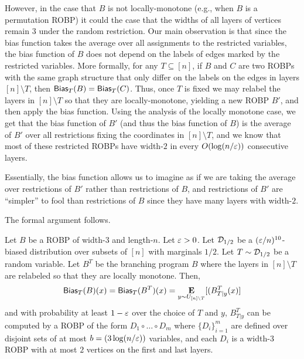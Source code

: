 However, in the case that $B$ is not locally-monotone (e.g.,  when $B$ is a permutation ROBP) it could the case that the widths of all layers of vertices remain $3$ under the random restriction.
Our main observation is that since the bias function takes the average over all assignments to the restricted variables, the bias function of $B$ does not depend on the labels of edges marked by the restricted variables. 
More formally, for any $T \subseteq [n]$, if $B$ and $C$ are two ROBPs with the same graph structure that only differ on the labels on the edges in layers $[n]\setminus T$, then $\mathsf{Bias}_T(B) = \mathsf{Bias}_T(C)$.
Thus, once $T$ is fixed we may relabel the layers in $[n]\setminus T$ so that they are locally-monotone, yielding a new ROBP $B'$, and then apply the bias function.
Using the analysis of the locally monotone case, we get that the bias function of $B'$ (and thus the bias function of $B$) is the average of $B'$ over all restrictions fixing the coordinates in $[n]\setminus T$, and we know that most of these restricted ROBPs have width-$2$ in every $O(\log (n/\varepsilon))$ consecutive layers.

Essentially, the bias function allows us to imagine as if we are taking the average over restrictions of $B'$ rather than restrictions of $B$, and restrictions of $B'$ are ``simpler'' to fool than restrictions of $B$ since they have many layers with width-$2$.


The formal argument follows.

\begin{theorem}\label{thm:the-bias-trick}
Let $B$ be a ROBP of width-$3$ and length-$n$. 
Let $\varepsilon>0$. 
Let ${\mathcal{D}}_{1/2}$ be a $(\varepsilon/n)^{10}$-biased distribution over subsets of $[n]$ with marginals $1/2$.
Let $T\sim {\mathcal{D}}_{1/2}$ be a random variable.
Let $B^T$ be the branching program $B$ where the layers in $[n] \setminus T$ are relabeled so that they are locally monotone.
Then, 
$$
\mathsf{Bias}_T(B)(x) = \mathsf{Bias}_T(B^T)(x) = \mathop{\bf E\/}_{y\sim U_{[n]\setminus T}}[(B^{T}_{T|y}(x)]
$$
and with  probability at least $1-\varepsilon$ over the choice of $T$ and $y$, $B^{T}_{T|y}$ can be computed by a ROBP of the form $D_1 \circ \ldots \circ D_m$ where $\{D_i\}_{i=1}^{m}$ are defined over disjoint sets of at most $b = (3\log(n/\varepsilon))$ variables, and each $D_i$ is a width-$3$ ROBP with at most $2$ vertices on the first and last layers.
\end{theorem}

